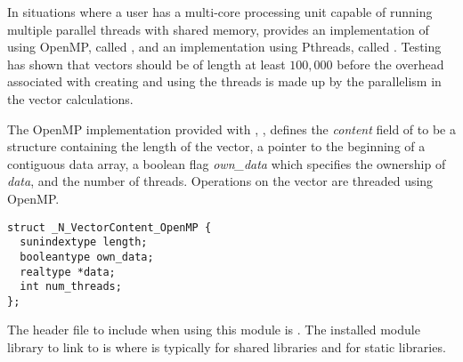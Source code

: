 
In situations where a user has a multi-core processing unit capable of
running multiple parallel threads with shared memory, {\sundials} provides
an implementation of {\nvector} using OpenMP, called {\nvecopenmp}, and
an implementation using Pthreads, called {\nvecpthreads}.  
Testing has shown that vectors should be of length at least $100,000$ 
before the overhead associated with creating and using the threads is
made up by the parallelism in the vector calculations. 

The OpenMP {\nvector} implementation provided with {\sundials},
{\nvecopenmp}, defines the {\em content} field of  to be a structure 
containing the length of the vector, a pointer to the beginning of a contiguous 
data array, a boolean flag {\em own\_data} which specifies the ownership 
of {\em data}, and the number of threads.  
Operations on the vector are threaded using OpenMP.
\begin{verbatim} 
struct _N_VectorContent_OpenMP {
  sunindextype length;
  booleantype own_data;
  realtype *data;
  int num_threads;
};
\end{verbatim}

The header file to include when using this module is .
The installed module library to link to is
where  is typically  for shared libraries and 
for static libraries.

